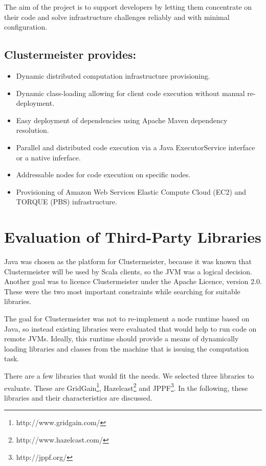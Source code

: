 \documentclass[english]{uzhpub}
\begin{document}
The aim of the project is to support developers by letting them concentrate on their code and solve infrastructure challenges reliably and with minimal configuration.

\subsection*{Clustermeister provides:}
\begin{itemize}
\item Dynamic distributed computation infrastructure provisioning.
\item Dynamic class-loading allowing for client code execution without manual re-deployment.
\item Easy deployment of dependencies using Apache Maven dependency resolution.
\item Parallel and distributed code execution via a Java ExecutorService interface or a native inferface.
\item Addressable nodes for code execution on specific nodes.
\item Provisioning of Amazon Web Services Elastic Compute Cloud (EC2) and TORQUE (PBS) infrastructure.
\end{itemize}

\section{Evaluation of Third-Party Libraries}

Java was chosen as the platform for Clustermeister, because it was known that Clustermeister will be used by Scala clients, so the JVM was a logical decision. Another goal was to licence Clustermeister under the Apache Licence, version 2.0. These were the two most important constraints while searching for suitable libraries.

The goal for Clustermeister was not to re-implement a node runtime based on Java, so instead existing libraries were evaluated that would help to run code on remote JVMs. Ideally, this runtime should provide a means of dynamically loading libraries and classes from the machine that is issuing the computation task.

There are a few libraries that would fit the needs. We selected three libraries to evaluate. These are 
GridGain\footnote{http://www.gridgain.com/}, 
Hazelcast\footnote{http://www.hazelcast.com/} and 
JPPF\footnote{http://jppf.org/}. In the following, these libraries and their characteristics are discussed.
\end{document}
